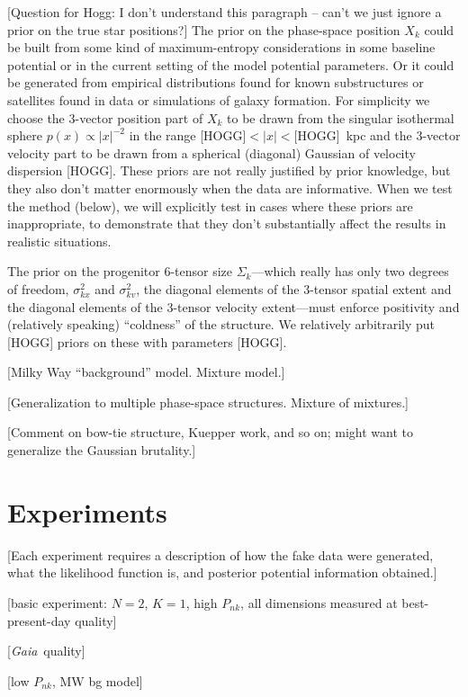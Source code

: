 \documentclass[letterpaper,12pt,preprint]{aastex}
\newcommand{\project}[1]{\textsl{#1}}
\newcommand{\gaia}{\project{Gaia}}
\begin{document}
[Question for Hogg: I don't understand this paragraph -- can't we just ignore a prior on the true star positions?]
The prior on the phase-space position $X_k$ could be built from some
kind of maximum-entropy considerations in some baseline potential or
in the current setting of the model potential parameters.  Or it could
be generated from empirical distributions found for known substructures or
satellites found in data or simulations of galaxy formation.  For
simplicity we choose the 3-vector position part of $X_k$ to be drawn
from the singular isothermal sphere $p(x)\propto |x|^{-2}$ in the
range [HOGG]$<|x|<$[HOGG]~kpc and the 3-vector velocity part to be
drawn from a spherical (diagonal) Gaussian of velocity dispersion
[HOGG].  These priors are not really justified by prior knowledge, but
they also don't matter enormously when the data are informative.  When
we test the method (below), we will explicitly test in cases where
these priors are inappropriate, to demonstrate that they don't
substantially affect the results in realistic situations.

The prior on the progenitor 6-tensor size $\Sigma_k$---which really
has only two degrees of freedom, $\sigma_{kx}^2$ and $\sigma_{kv}^2$, the
diagonal elements of the 3-tensor spatial extent and the diagonal
elements of the 3-tensor velocity extent---must enforce positivity and
(relatively speaking) ``coldness'' of the structure.  We relatively
arbitrarily put [HOGG] priors on these with parameters [HOGG].

[Milky Way ``background'' model.  Mixture model.]

[Generalization to multiple phase-space structures. Mixture of
  mixtures.]

[Comment on bow-tie structure, Kuepper work, and so on;
  might want to generalize the Gaussian brutality.]

\section{Experiments}

[Each experiment requires a description of how the fake data were
  generated, what the likelihood function is, and posterior potential
  information obtained.]

[basic experiment: $N=2$, $K=1$, high $P_{nk}$, all dimensions
  measured at best-present-day quality]

[\gaia\ quality]

[low $P_{nk}$, MW bg model]
\end{document}
